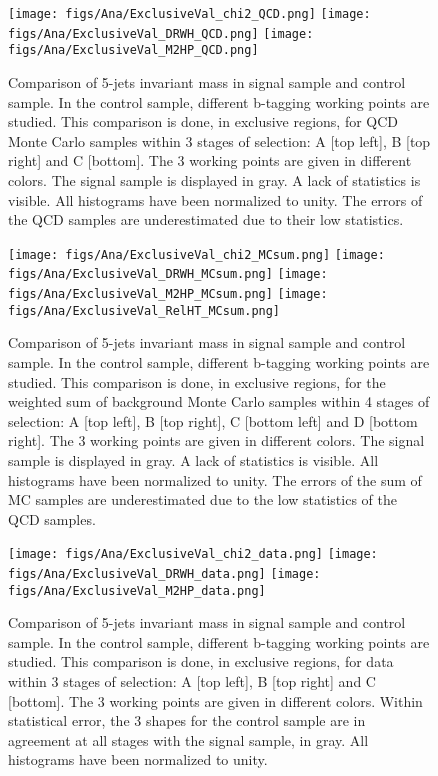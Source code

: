 \begin{figure}[!Hhtbp]
  \begin{center}
    \texttt{[image: figs/Ana/ExclusiveVal\_chi2\_QCD.png]}
    \texttt{[image: figs/Ana/ExclusiveVal\_DRWH\_QCD.png]}
    \texttt{[image: figs/Ana/ExclusiveVal\_M2HP\_QCD.png]}
    \caption{Comparison of 5-jets invariant mass in signal sample and control sample. In the control sample, different b-tagging working points are studied. This comparison is done, in exclusive regions, for QCD Monte Carlo samples within 3 stages of selection: A [top left], B [top right] and C [bottom]. The 3 working points are given in different colors. The signal sample is displayed in gray. A lack of statistics is visible. All histograms have been normalized to unity. The errors of the QCD samples are underestimated due to their low statistics. }
    \label{fig:StageExWPQCD}
  \end{center}
\end{figure}

\begin{figure}[!Hhtbp]
  \begin{center}
    \texttt{[image: figs/Ana/ExclusiveVal\_chi2\_MCsum.png]}
    \texttt{[image: figs/Ana/ExclusiveVal\_DRWH\_MCsum.png]}
    \texttt{[image: figs/Ana/ExclusiveVal\_M2HP\_MCsum.png]}
    \texttt{[image: figs/Ana/ExclusiveVal\_RelHT\_MCsum.png]}
    \caption{Comparison of 5-jets invariant mass in signal sample and control sample. In the control sample, different b-tagging working points are studied. This comparison is done, in exclusive regions, for the weighted sum of background Monte Carlo samples within 4 stages of selection: A [top left], B [top right], C [bottom left] and D [bottom right]. The 3 working points are given in different colors. The signal sample is displayed in gray. A lack of statistics is visible. All histograms have been normalized to unity. The errors of the sum of MC samples are underestimated due to the low statistics of the QCD samples.}
    \label{fig:StageExWPSum}
  \end{center}
\end{figure}

\begin{figure}[!Hhtbp]
  \begin{center}
    \texttt{[image: figs/Ana/ExclusiveVal\_chi2\_data.png]}
    \texttt{[image: figs/Ana/ExclusiveVal\_DRWH\_data.png]}
    \texttt{[image: figs/Ana/ExclusiveVal\_M2HP\_data.png]}
    \caption{Comparison of 5-jets invariant mass in signal sample and control sample. In the control sample, different b-tagging working points are studied. This comparison is done, in exclusive regions, for data within 3 stages of selection: A [top left], B [top right] and C [bottom]. The 3 working points are given in different colors. Within statistical error, the 3 shapes for the control sample are in agreement at all stages with the signal sample, in gray. All histograms have been normalized to unity.}
    \label{fig:StageExWPData}
  \end{center}
\end{figure}

